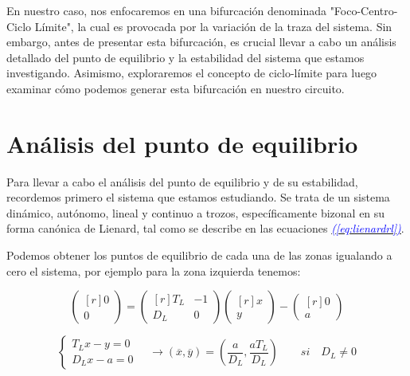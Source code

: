 \documentclass[12pt,a4paper]{report} %
\newcommand{\eref}[1]{\hyperref[#1]{\textcolor{blue}{\textit{(\ref*{#1})}}}}
\begin{document}
	\vspace{0.5cm}\noindent En nuestro caso, nos enfocaremos en una bifurcación denominada "Foco-Centro-Ciclo Límite", la cual es provocada por la variación de la traza del sistema. Sin embargo, antes de presentar esta bifurcación, es crucial llevar a cabo un análisis detallado del punto de equilibrio y la estabilidad del sistema que estamos investigando. Asimismo, exploraremos el concepto de ciclo-límite para luego examinar cómo podemos generar esta bifurcación en nuestro circuito.
	
	\newpage
	
	\section{Análisis del punto de equilibrio}
	
		\vspace{0.5cm}Para llevar a cabo el análisis del punto de equilibrio y de su estabilidad, recordemos primero el sistema que estamos estudiando. Se trata de un sistema dinámico, autónomo, lineal y continuo a trozos, específicamente bizonal en su forma canónica de Lienard, tal como se describe en las ecuaciones \eref{eq:lienardrl}.
		
		\vspace{0.5cm}Podemos obtener los puntos de equilibrio de cada una de las zonas igualando a cero el sistema, por ejemplo para la zona izquierda tenemos:

		
		\begin{equation*}
			\begin{pmatrix*}[r]
				0\\ 0
			\end{pmatrix*}= \begin{pmatrix*}[r]
				T_L & -1 \\ D_L & 0
			\end{pmatrix*} \begin{pmatrix*}[r]
				x \\ y
			\end{pmatrix*}-\begin{pmatrix*}[r]
				0 \\ a
			\end{pmatrix*}
		\end{equation*}\smallskip
		
		\begin{equation}
			\label{eq:eqpointL}
			\left\{
			\begin{aligned}
				T_Lx-y=0\\
				D_Lx-a=0
			\end{aligned}
			\right. \quad \longrightarrow \left( \overline{x},\overline{y} \right)=\left( \frac{a}{D_L},\frac{aT_L}{D_L} \right) \qquad si \quad D_L\neq0
		\end{equation}\smallskip
		
\end{document}
